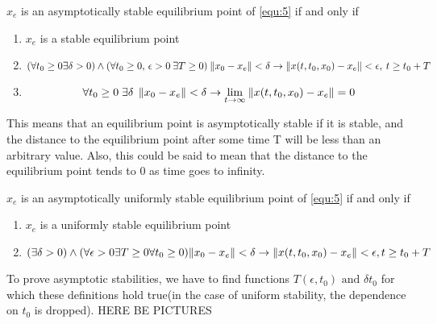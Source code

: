 {
    $x_e$ is an asymptotically stable equilibrium point of  \ref{equ:5} if and only if \\
    \begin{enumerate}
        \item $x_e$ is a stable equilibrium point
        \item  \begin{equation}
                \label{dfn:astab_eq_pt:1}
                (\forall t_0 \ge 0 \exists  \delta > 0  ) \wedge (\forall t_0\ge 0, \, \epsilon > 0 \: \exists T \ge 0  )\: \lVert x_0-x_e\rVert < \delta \rightarrow \lVert x(t,t_0,x_0)-x_e\rVert < \epsilon, \: t \ge t_0+T
            \end{equation}
        \item  \begin{equation}
                \label{dfn:astab_eq_pt:2}
                \forall t_0\ge 0 \; \exists \delta \: \: \lVert x_0 -x_e\rVert < \delta \rightarrow \lim_{t \to \infty} \: \lVert x(t,t_0,x_0)-x_e\rVert = 0  
            \end{equation}
    \end{enumerate}

   This means that an equilibrium point is asymptotically stable if it is stable, and the distance to the equilibrium point after some time T will be less than an arbitrary value. Also, this could be said to mean that the distance to the equilibrium point tends to 0 as time goes to infinity.
}



{
    $x_e$ is an asymptotically uniformly stable equilibrium point of  \ref{equ:5} if and only if \\
    \begin{enumerate}
        \item $x_e$ is a uniformly stable equilibrium point
        \item 
             \begin{equation}
                \label{dfn:austab_eq_pt}
                (\exists \delta > 0 ) \wedge (\forall \epsilon > 0 \exists T \ge 0 \forall t_0 \ge  0) \lVert x_0 - x_e\rVert < \delta \rightarrow  \lVert x(t,t_0,x_0) - x_e\rVert < \epsilon, t \ge t_0+T
            \end{equation}
    \end{enumerate}
    \nt
    {To prove asymptotic stabilities, we have to find functions $T(\epsilon, t_0)\text{ and } \delta{t_0}$ for which these definitions hold true(in the case of uniform stability, the dependence on $t_0$ is dropped). 
    HERE BE PICTURES
    }

}

